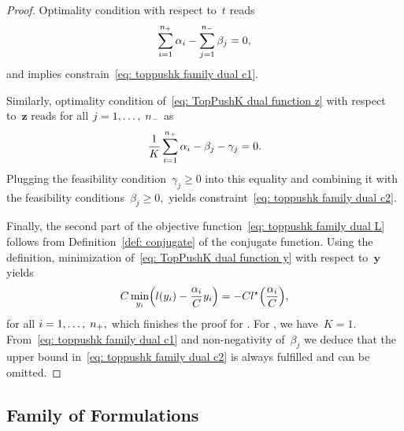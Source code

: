 \begin{proof}
  Optimality condition with respect to~$t$ reads 
  \begin{equation*}
    \sum_{i = 1}^{n_{+}} \alpha_i - \sum_{j = 1}^{n_{-}} \beta_j = 0,
  \end{equation*}
  and implies constrain~\eqref{eq: toppushk family dual c1}.
  
  Similarly, optimality condition of~\eqref{eq: TopPushK dual function z} with respect to~$\bm{z}$ reads for all $j = 1, \ldots, \; n_{-}$ as 
  \begin{equation*}
    \frac{1}{K} \sum_{i = 1}^{n_{+}} \alpha_i - \beta_j - \gamma_j = 0.
  \end{equation*}
  Plugging the feasibility condition~$\gamma_j \geq 0$ into this equality and combining it with the feasibility conditions~$\beta_j \geq 0,$ yields constraint~\eqref{eq: toppushk family dual c2}.
  
  Finally, the second part of the objective function~\eqref{eq: toppushk family dual L} follows from Definition~\ref{def: conjugate} of the conjugate function. Using the definition, minimization of~\eqref{eq: TopPushK dual function y} with respect to~$\bm{y}$ yields
  \begin{equation*}
    C \min_{y_i} \Brac{l(y_i) - \frac{\alpha_i}{C} y_i} = - C l^{\star} \Brac{\frac{\alpha_i}{C}},
  \end{equation*}
  for all $i = 1, \ldots, \; n_{+},$ which finishes the proof for \TopPushK. For \TopPush, we have~$K = 1.$ From~\eqref{eq: toppushk family dual c1} and non-negativity of~$\beta_j$ we deduce that the upper bound in~\eqref{eq: toppushk family dual c2} is always fulfilled and can be omitted.
\end{proof}

\subsection{Family of \PatMat Formulations}

\patdual*

\pagebreak


